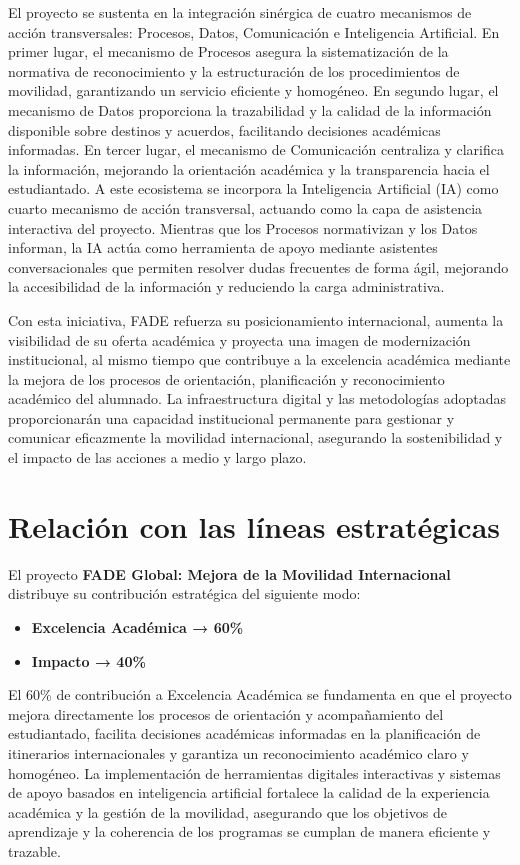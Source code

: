 \documentclass[11pt,a4paper]{scrreprt}
\begin{document}
El proyecto se sustenta en la integración sinérgica de cuatro mecanismos de acción transversales: Procesos, Datos, Comunicación e Inteligencia Artificial. En primer lugar, el mecanismo de Procesos asegura la sistematización de la normativa de reconocimiento y la estructuración de los procedimientos de movilidad, garantizando un servicio eficiente y homogéneo. En segundo lugar, el mecanismo de Datos proporciona la trazabilidad y la calidad de la información disponible sobre destinos y acuerdos, facilitando decisiones académicas informadas. En tercer lugar, el mecanismo de Comunicación centraliza y clarifica la información, mejorando la orientación académica y la transparencia hacia el estudiantado. A este ecosistema se incorpora la Inteligencia Artificial (IA) como cuarto mecanismo de acción transversal, actuando como la capa de asistencia interactiva del proyecto. Mientras que los Procesos normativizan y los Datos informan, la IA actúa como herramienta de apoyo mediante asistentes conversacionales que permiten resolver dudas frecuentes de forma ágil, mejorando la accesibilidad de la información y reduciendo la carga administrativa.

Con esta iniciativa, FADE refuerza su posicionamiento internacional, aumenta la visibilidad de su oferta académica y proyecta una imagen de modernización institucional, al mismo tiempo que contribuye a la excelencia académica mediante la mejora de los procesos de orientación, planificación y reconocimiento académico del alumnado. La infraestructura digital y las metodologías adoptadas proporcionarán una capacidad institucional permanente para gestionar y comunicar eficazmente la movilidad internacional, asegurando la sostenibilidad y el impacto de las acciones a medio y largo plazo.

\section{Relación con las líneas estratégicas}

\small
El proyecto \textbf{FADE Global: Mejora de la Movilidad Internacional} distribuye su contribución estratégica del siguiente modo:

\begin{itemize}[noitemsep,topsep=2pt]
\item \textbf{Excelencia Académica → 60\%}
\item \textbf{Impacto → 40\%}
\end{itemize}

El 60\% de contribución a Excelencia Académica se fundamenta en que el proyecto mejora directamente los procesos de orientación y acompañamiento del estudiantado, facilita decisiones académicas informadas en la planificación de itinerarios internacionales y garantiza un reconocimiento académico claro y homogéneo. La implementación de herramientas digitales interactivas y sistemas de apoyo basados en inteligencia artificial fortalece la calidad de la experiencia académica y la gestión de la movilidad, asegurando que los objetivos de aprendizaje y la coherencia de los programas se cumplan de manera eficiente y trazable.
\end{document}
